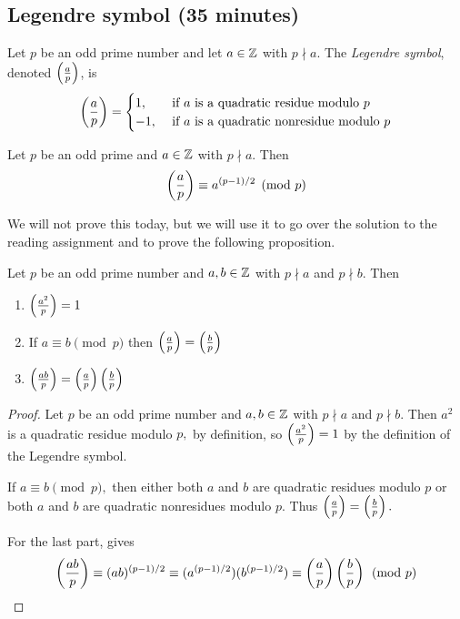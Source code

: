 \documentclass{../ximera}
\begin{document}
\subsection{Legendre symbol (35 minutes)}

\begin{definition}\label{defn:legendre}
    Let $p$ be an odd prime number and let $a\in\mathbb Z$ with $p\nmid a$. The \emph{Legendre symbol}, denoted $\left(\frac{a}{p}\right)$, is
        \[
            \left(\frac{a}{p}\right)=
            \begin{cases}
                1, & \text{ if $a$ is a quadratic residue modulo $p$} \\
                -1, & \text{ if $a$ is a quadratic nonresidue modulo $p$} 
            \end{cases}
        \]
\end{definition}

\begin{thm*}\label{thm:euler-quads}
    Let $p$ be an odd prime and $a\in\mathbb Z$ with $p\nmid a.$ Then \[\left(\frac{a}{p}\right)\equiv a^{(p-1)/2}\pmod{p}\]
\end{thm*}

We will not prove this today, but we will use it to go over the solution to the reading assignment and to prove the following proposition.

\begin{prop*}[Proposition 4.5]\label{prop:legendre-facts}
	Let $p$ be an odd prime number and $a,b\in\mathbb Z$ with $p\nmid a$ and $p\nmid b.$ Then 
	\begin{enumerate}[label=(\alph*)]
		\item $\left(\frac{a^2}{p}\right)=1$ \label{squares-are-square}
		\item If $a\equiv b\pmod{p}$ then $\left(\frac{a}{p}\right)=\left(\frac{b}{p}\right)$ \label{legendre-respects-mod}
		\item $\left(\frac{ab}{p}\right)=\left(\frac{a}{p}\right)\left(\frac{b}{p}\right)$ \label{legendre-mult}
	\end{enumerate}
\end{prop*}


\begin{proof}
    Let $p$ be an odd prime number and $a,b\in\mathbb Z$ with $p\nmid a$ and $p\nmid b.$ Then $a^2$ is a quadratic residue modulo $p,$ by definition, so $\left(\frac{a^2}{p}\right)=1$ by the definition of the Legendre symbol.

    If $a\equiv b\pmod{p},$ then either both $a$ and $b$ are quadratic residues modulo $p$ or both $a$ and $b$ are quadratic nonresidues modulo $p.$ Thus $\left(\frac{a}{p}\right)=\left(\frac{b}{p}\right).$

    For the last part,  gives \[\left(\frac{ab}{p}\right)\equiv (ab)^{(p-1)/2}\equiv (a^{(p-1)/2})(b^{(p-1)/2})\equiv \left(\frac{a}{p}\right)\left(\frac{b}{p}\right)\pmod{p}\]
\end{proof}
\end{document}
